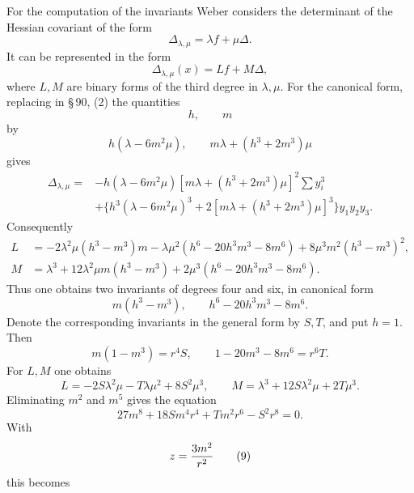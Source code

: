 \documentclass[11pt]{article}
\begin{document}
For the computation of the invariants Weber considers the determinant of the Hessian covariant of the form
\begin{equation}
 \Delta_{\lambda,\mu}=\lambda f+\mu\Delta.
 \tag{1}
\end{equation}
It can be represented in the form
\begin{equation}
 \Delta_{\lambda,\mu}(x)=Lf+M\Delta,
 \tag{2}
\end{equation}
where $L,M$ are binary forms of the third degree in $\lambda,\mu$. For the canonical form, replacing in \S\,90, (2) the quantities
\[
 h,\qquad m
\]
by
\[
 h(\lambda-6m^2\mu),\qquad m\lambda+(h^3+2m^3)\mu
\]
gives
\begin{equation}
\begin{aligned}
\Delta_{\lambda,\mu}={}&-h(\lambda-6m^2\mu)[m\lambda+(h^3+2m^3)\mu]^2\sum y_i^3\\
&+\{h^3(\lambda-6m^2\mu)^3+2[m\lambda+(h^3+2m^3)\mu]^3\}y_1y_2y_3.
\end{aligned}
\tag{3}
\end{equation}
Consequently
\begin{equation}
\begin{aligned}
 L&=-2\lambda^2\mu(h^3-m^3)m-\lambda\mu^2(h^6-20h^3m^3-8m^6)+8\mu^3m^2(h^3-m^3)^2,\\
 M&=\lambda^3+12\lambda^2\mu m(h^3-m^3)+2\mu^3(h^6-20h^3m^3-8m^6).
\end{aligned}
\tag{4}
\end{equation}
Thus one obtains two invariants of degrees four and six, in canonical form
\begin{equation}
 m(h^3-m^3),
 \qquad h^6-20h^3m^3-8m^6.
 \tag{5}
\end{equation}
Denote the corresponding invariants in the general form by $S,T$, and put $h=1$. Then
\begin{equation}
 m(1-m^3)=r^4S,
 \qquad 1-20m^3-8m^6=r^6T.
 \tag{6}
\end{equation}
For $L,M$ one obtains
\begin{equation}
 L=-2S\lambda^2\mu-T\lambda\mu^2+8S^2\mu^3,
 \qquad M=\lambda^3+12S\lambda^2\mu+2T\mu^3.
 \tag{7}
\end{equation}
Eliminating $m^2$ and $m^5$ gives the equation
\begin{equation}
 27m^8+18Sm^4r^4+Tm^2r^6-S^2r^8=0.
 \tag{8}
\end{equation}
With
\begin{equation}
 z={3m^2\over r^2}
 \tag{9}
\end{equation}
this becomes
\end{document}
